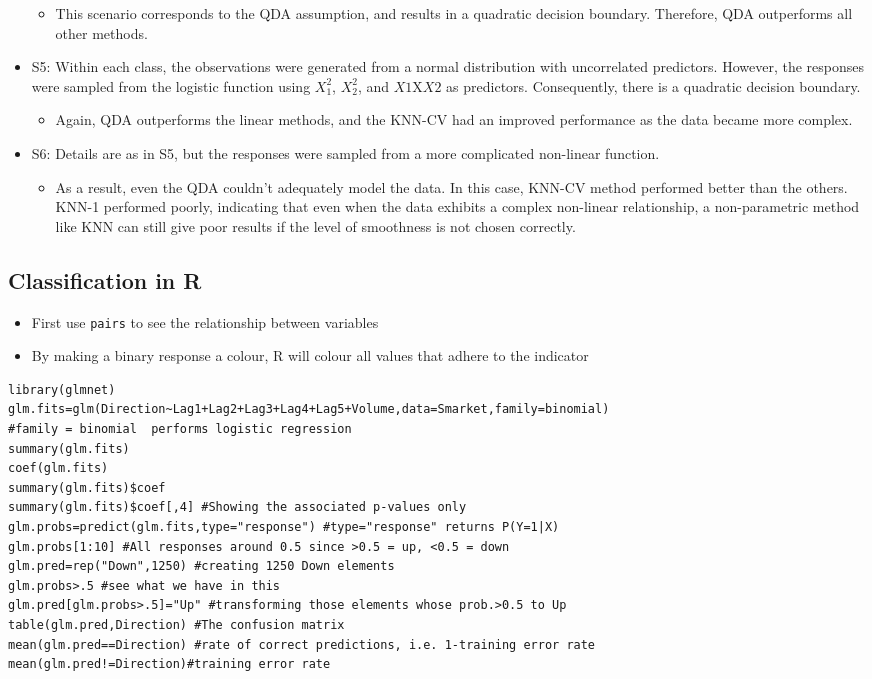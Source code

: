 \documentclass{article}
\begin{document}
\begin{itemize}
\begin{itemize}
        \item This scenario corresponds to the QDA assumption, and results in a quadratic decision boundary. Therefore, QDA outperforms all other methods.
    \end{itemize}
    \item S5: Within each class, the observations were generated from a normal distribution with uncorrelated predictors. However, the responses were sampled from the logistic function using $X_1^2$, $X_2^2$, and $X1 \text{X} X2$ as predictors. Consequently, there is a quadratic decision boundary.
    \begin{itemize}
        \item Again, QDA outperforms the linear methods, and the KNN-CV had an improved performance as the data became more complex.
    \end{itemize}
    \item S6: Details are as in S5, but the responses were sampled from a more complicated non-linear function.
    \begin{itemize}
        \item As a result, even the QDA couldn't adequately model the data. In this case, KNN-CV method performed better than the others. KNN-1 performed poorly, indicating that even when the data exhibits a complex non-linear relationship, a non-parametric method like KNN can still give poor results if the level of smoothness is not chosen correctly.
    \end{itemize}
\end{itemize}

\subsection{Classification in R}

\begin{itemize}
    \item First use \texttt{pairs} to see the relationship between variables
    \item By making a binary response a colour, R will colour all values that adhere to the indicator 
\end{itemize}

\begin{lstlisting}
library(glmnet)
glm.fits=glm(Direction~Lag1+Lag2+Lag3+Lag4+Lag5+Volume,data=Smarket,family=binomial)
#family = binomial  performs logistic regression
summary(glm.fits)
coef(glm.fits)
summary(glm.fits)$coef
summary(glm.fits)$coef[,4] #Showing the associated p-values only
glm.probs=predict(glm.fits,type="response") #type="response" returns P(Y=1|X)
glm.probs[1:10] #All responses around 0.5 since >0.5 = up, <0.5 = down
glm.pred=rep("Down",1250) #creating 1250 Down elements
glm.probs>.5 #see what we have in this 
glm.pred[glm.probs>.5]="Up" #transforming those elements whose prob.>0.5 to Up
table(glm.pred,Direction) #The confusion matrix
mean(glm.pred==Direction) #rate of correct predictions, i.e. 1-training error rate
mean(glm.pred!=Direction)#training error rate
\end{lstlisting}
\end{document}
